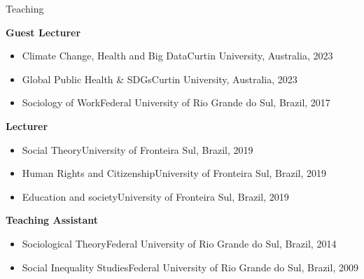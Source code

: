 \begin{rSection}{Teaching}

\large  {\textbf{Guest Lecturer}}

\begin{itemize}
\item{Climate Change, Health and Big Data}\hfill{Curtin University, Australia, 2023}
\item{Global Public Health \& SDGs}\hfill{Curtin University, Australia,  2023}
\item{Sociology of Work}\hfill{Federal University of Rio Grande do Sul, Brazil, 2017}
\end{itemize}

\vspace{1em}
\large  {\textbf{Lecturer}}

\begin{itemize}
\item{Social Theory}\hfill{University of Fronteira Sul, Brazil, 2019}
\item{Human Rights and Citizenship}\hfill{University of Fronteira Sul, Brazil, 2019}
\item{Education and society}\hfill{University of Fronteira Sul, Brazil, 2019}
\end{itemize}

\vspace{1em}
\large  {\textbf{Teaching Assistant}}

\begin{itemize}
\item{Sociological Theory}\hfill{Federal University of Rio Grande do Sul, Brazil, 2014}
\item{Social Inequality Studies}\hfill{Federal University of Rio Grande do Sul, Brazil, 2009}
\end{itemize}

\end{rSection}